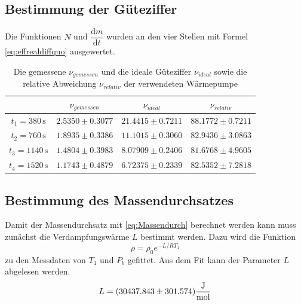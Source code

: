 \subsection{Bestimmung der Güteziffer}

Die Funktionen $N$ und $\dfrac{\text{d}m}{\text{d}t}$ wurden an den vier Stellen mit Formel \eqref{eq:effrealdiffquo} ausgewertet.

\begin{table}[H]
  \centering
  \label{tab:gueteziffer}
  \begin{tabular}{S S S S[table-format=2.4]}
    \toprule
    & {$ν_{gemessen}$} &  {$ν_{ideal}$} & {$ν_{relativ}$} \\
    \midrule
    {$t_1 = 380  \, \unit{\second}$} & {$2.5350 \pm 0.3077$} & {$21.4415 \pm 0.7211$} &  {$88.1772 \pm 0.7211$} \\
    {$t_2 = 760  \, \unit{\second}$} & {$1.8935 \pm 0.3386$} & {$11.1015 \pm 0.3060$} &   {$82.9436 \pm 3.0863$}\\            
    {$t_3 = 1140 \, \unit{\second}$} & {$1.4804 \pm 0.3983$} & {$8.07909 \pm 0.2406$} &  {$81.6768 \pm 4.9605$}\\
    {$t_4 = 1520 \, \unit{\second}$} & {$1.1743 \pm 0.4879$} & {$6.72375 \pm 0.2339$} &  {$82.5352\pm 7.2818$}\\
    \bottomrule
  \end{tabular}
  \caption{Die gemessene $ν_{gemessen}$ und die ideale Güteziffer $ν_{ideal}$ sowie die relative Abweichung $ν_{relativ}$ der verwendeten Wärmepumpe}
\end{table}

\subsection{Bestimmung des Massendurchsatzes}

Damit der Massendurchsatz mit \eqref{eq:Massendurch} berechnet werden kann muss zunächst die Verdampfungswärme $L$ bestimmt werden.
Dazu wird die Funktion 
\begin{equation}
  \rho = \rho_0 e^{-L/R T_1}
\end{equation}
zu den Messdaten von $T_1$ und $P_b$ gefittet. Aus dem Fit kann der Parameter $L$ abgelesen werden.\\

\begin{equation}
  L = (30437.843 \pm 301.574) \unit{\dfrac{\joule}{\mol}}
\end{equation}

